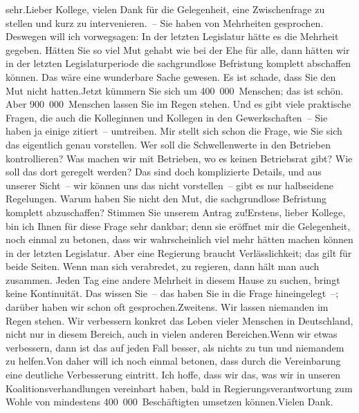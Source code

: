 \documentclass{article}
\begin{document}
sehr.Lieber Kollege, vielen Dank für die Gelegenheit, eine Zwischenfrage zu stellen und kurz zu intervenieren. – Sie haben von Mehrheiten gesprochen. Deswegen will ich vorwegsagen: In der letzten Legislatur hätte es die Mehrheit gegeben. Hätten Sie so viel Mut gehabt wie bei der Ehe für alle, dann hätten wir in der letzten Legislaturperiode die sachgrundlose Befristung komplett abschaffen können. Das wäre eine wunderbare Sache gewesen. Es ist schade, dass Sie den Mut nicht hatten.Jetzt kümmern Sie sich um 400 000 Menschen; das ist schön. Aber 900 000 Menschen lassen Sie im Regen stehen. Und es gibt viele praktische Fragen, die auch die Kolleginnen und Kollegen in den Gewerkschaften – Sie haben ja einige zitiert – umtreiben. Mir stellt sich schon die Frage, wie Sie sich das eigentlich genau vorstellen. Wer soll die Schwellenwerte in den Betrieben kontrollieren? Was machen wir mit Betrieben, wo es keinen Betriebsrat gibt? Wie soll das dort geregelt werden? Das sind doch komplizierte Details, und aus unserer Sicht – wir können uns das nicht vorstellen – gibt es nur halbseidene Regelungen. Warum haben Sie nicht den Mut, die sachgrundlose Befristung komplett abzuschaffen? Stimmen Sie unserem Antrag zu!Erstens, lieber Kollege, bin ich Ihnen für diese Frage sehr dankbar; denn sie eröffnet mir die Gelegenheit, noch einmal zu betonen, dass wir wahrscheinlich viel mehr hätten machen können in der letzten Legislatur. Aber eine Regierung braucht Verlässlichkeit; das gilt für beide Seiten. Wenn man sich verabredet, zu regieren, dann hält man auch zusammen. Jeden Tag eine andere Mehrheit in diesem Hause zu suchen, bringt keine Kontinuität. Das wissen Sie – das haben Sie in die Frage hineingelegt –; darüber haben wir schon oft gesprochen.Zweitens. Wir lassen niemanden im Regen stehen. Wir verbessern konkret das Leben vieler Menschen in Deutschland, nicht nur in diesem Bereich, auch in vielen anderen Bereichen.Wenn wir etwas verbessern, dann ist das auf jeden Fall besser, als nichts zu tun und niemandem zu helfen.Von daher will ich noch einmal betonen, dass durch die Vereinbarung eine deutliche Verbesserung eintritt. Ich hoffe, dass wir das, was wir in unseren Koalitionsverhandlungen vereinbart haben, bald in Regierungsverantwortung zum Wohle von mindestens 400 000 Beschäftigten umsetzen können.Vielen Dank.
\end{document}

